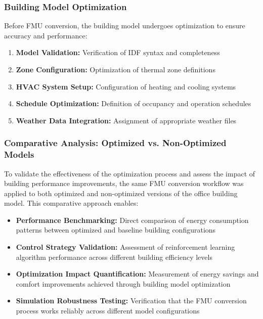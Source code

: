 \documentclass[12pt,a4paper]{article}
\begin{document}
\subsubsection{Building Model Optimization}

Before FMU conversion, the building model undergoes optimization to ensure accuracy and performance:

\begin{enumerate}
    \item \textbf{Model Validation:} Verification of IDF syntax and completeness
    \item \textbf{Zone Configuration:} Optimization of thermal zone definitions
    \item \textbf{HVAC System Setup:} Configuration of heating and cooling systems
    \item \textbf{Schedule Optimization:} Definition of occupancy and operation schedules
    \item \textbf{Weather Data Integration:} Assignment of appropriate weather files
\end{enumerate}

\subsubsection{Comparative Analysis: Optimized vs. Non-Optimized Models}

To validate the effectiveness of the optimization process and assess the impact of building performance improvements, the same FMU conversion workflow was applied to both optimized and non-optimized versions of the office building model. This comparative approach enables:

\begin{itemize}
    \item \textbf{Performance Benchmarking:} Direct comparison of energy consumption patterns between optimized and baseline building configurations
    \item \textbf{Control Strategy Validation:} Assessment of reinforcement learning algorithm performance across different building efficiency levels
    \item \textbf{Optimization Impact Quantification:} Measurement of energy savings and comfort improvements achieved through building model optimization
    \item \textbf{Simulation Robustness Testing:} Verification that the FMU conversion process works reliably across different model configurations
\end{itemize}
\end{document}

